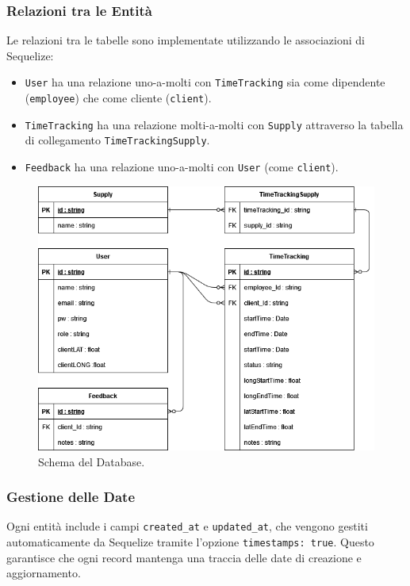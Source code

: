 \documentclass[twoside]{supsistudent}
\begin{document}
\subsubsection{Relazioni tra le Entità}
Le relazioni tra le tabelle sono implementate utilizzando le associazioni di Sequelize:
\begin{itemize}
  \item \texttt{User} ha una relazione uno-a-molti con \texttt{TimeTracking} sia come dipendente (\texttt{employee}) che come cliente (\texttt{client}).
  \item \texttt{TimeTracking} ha una relazione molti-a-molti con \texttt{Supply} attraverso la tabella di collegamento \texttt{TimeTrackingSupply}.
  \item \texttt{Feedback} ha una relazione uno-a-molti con \texttt{User} (come \texttt{client}).
\end{itemize}

\begin{figure}[ht]
  \centering
  \includegraphics[scale=0.6]{./images/dbschema.png}
  \caption{Schema del Database.}
  \label{fig:databaseschema}
\end{figure}

\subsubsection{Gestione delle Date}
Ogni entità include i campi \texttt{created\_at} e \texttt{updated\_at}, che vengono gestiti automaticamente da Sequelize tramite l'opzione \texttt{timestamps: true}. Questo garantisce che ogni record mantenga una traccia delle date di creazione e aggiornamento.
\end{document}
